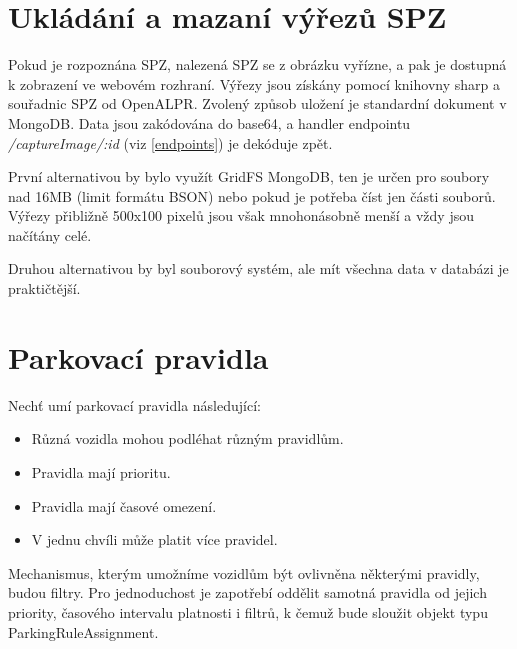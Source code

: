 \section{Ukládání a mazaní výřezů SPZ}

\noindent
Pokud je rozpoznána SPZ, nalezená SPZ se z obrázku vyřízne, a pak je dostupná k zobrazení ve webovém rozhraní.
Výřezy jsou získány pomocí knihovny sharp a souřadnic SPZ od OpenALPR.
Zvolený způsob uložení je standardní dokument v MongoDB. Data jsou zakódována do base64,
a handler endpointu \textit{/captureImage/:id} (viz \ref{endpoints}) je dekóduje zpět.

První alternativou by bylo využít GridFS MongoDB, ten je určen pro soubory
nad 16MB (limit formátu BSON) nebo pokud je potřeba číst jen části souborů.
Výřezy přibližně 500x100 pixelů jsou však mnohonásobně menší a vždy jsou načítány celé.

Druhou alternativou by byl souborový systém, ale mít všechna data v databázi je praktičtější.

\section{Parkovací pravidla} \label{analysis_parking_schema}

\noindent
Nechť umí parkovací pravidla následující:

\begin{itemize}
  \setlength\itemsep{.05em}
  \item Různá vozidla mohou podléhat různým pravidlům.
  \item Pravidla mají prioritu.
  \item Pravidla mají časové omezení.
  \item V jednu chvíli může platit více pravidel.
\end{itemize}

Mechanismus, kterým umožníme vozidlům být ovlivněna některými pravidly,
budou filtry.
Pro jednoduchost je zapotřebí oddělit samotná pravidla od jejich
priority, časového intervalu platnosti i filtrů,
k čemuž bude sloužit objekt typu ParkingRuleAssignment.

